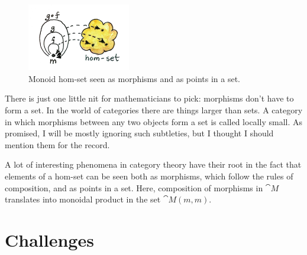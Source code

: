 \begin{figure}[H]
\centering
\includegraphics[width=0.4\textwidth]{images/monoidhomset.jpg}
\caption{Monoid hom-set seen as morphisms and as points in a set.}
\end{figure}

\noindent
There is just one little nit for mathematicians to pick: morphisms don't
have to form a set. In the world of categories there are things larger
than sets. A category in which morphisms between any two objects form a
set is called locally small. As promised, I will be mostly ignoring such
subtleties, but I thought I should mention them for the record.

A lot of interesting phenomena in category theory have their root in the
fact that elements of a hom-set can be seen both as morphisms, which
follow the rules of composition, and as points in a set. Here,
composition of morphisms in $\cat{M}$ translates into monoidal product in the
set $\cat{M}(m, m)$.

\section{Challenges}

